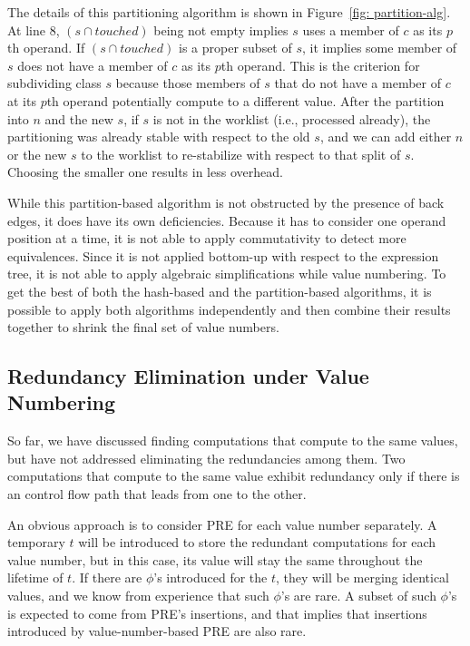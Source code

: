 The details of this partitioning algorithm is shown in
Figure~\ref{fig: partition-alg}.  At line 8, $(s \cap touched)$ being
not empty implies $s$ uses a member of $c$ as its $p$th operand.  If
$(s \cap touched)$ is a proper subset of $s$, it implies some member of $s$ 
does not have a member
of $c$ as its $p$th operand.  This is the criterion for subdividing
class $s$ because those members of $s$ that do not have a member of $c$ at
its $p$th operand potentially compute to a different value.  
After the partition into $n$ and the new $s$,
if $s$ is not in the worklist (i.e., processed already), the 
partitioning was already stable with respect to the old $s$, and
we can add either $n$ or the new $s$ to the worklist to re-stabilize with
respect to that split of $s$.  Choosing the smaller one results in less
overhead.

While this partition-based algorithm is not obstructed by the presence of
back edges, it does have its own deficiencies.  Because it has to consider
one operand position at a time, it is not able to apply commutativity to
detect more equivalences.  Since it is not applied bottom-up with respect to
the expression tree, it is not able to apply algebraic simplifications
while value numbering.
To get the best of both the hash-based and the partition-based algorithms,
it is possible to apply both algorithms independently and then combine their
results together to shrink the final set of value numbers.

\subsection{Redundancy Elimination under Value Numbering}

So far, we have discussed finding computations that compute to the
same values, but have not addressed eliminating the redundancies
among them.  Two computations that compute to the same value exhibit redundancy 
only if there is an control flow path that leads from one to the other.

An obvious approach is to consider PRE for each value
number separately.  A temporary $t$ will be introduced to store the redundant
computations for each value number, but in this case, its value will stay the 
same throughout the lifetime of $t$.  If there are $\phi$'s introduced for
the $t$, they will be merging identical values, and we know from
experience that such $\phi$'s are rare.  A subset of such $\phi$'s is expected 
to come from PRE's insertions, and that implies that insertions
introduced by value-number-based PRE are also rare.

